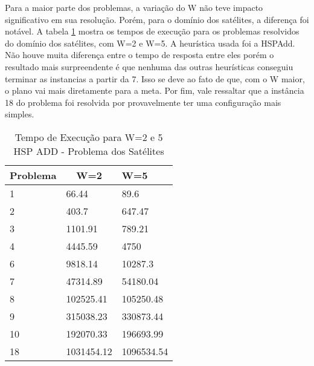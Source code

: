 Para a maior parte dos problemas, a variação do W não teve impacto significativo em sua resolução. Porém, para o domínio dos satélites, a diferença foi notável. A tabela \ref{analisew} mostra os tempos de execução para os problemas resolvidos do domínio dos satélites, com W=2 e W=5. A heurística usada foi a HSPAdd. Não houve muita diferença entre o tempo de resposta entre eles porém o resultado mais surpreendente é que nenhuma das outras heurísticas conseguiu terminar as instancias a partir da 7. Isso se deve ao fato de que, com o W maior, o plano vai mais diretamente para a meta. Por fim, vale ressaltar que a instância 18 do problema foi resolvida por provavelmente ter uma configuração mais simples.

\begin{table}[H]
\begin{tabular}{|l|l|l|}
\hline
Problema & \multicolumn{1}{c|}{W=2} & W=5        \\ \hline
1        & 66.44                    & 89.6       \\ \hline
2        & 403.7                    & 647.47     \\ \hline
3        & 1101.91                  & 789.21     \\ \hline
4        & 4445.59                  & 4750       \\ \hline
6        & 9818.14                  & 10287.3    \\ \hline
7        & 47314.89                 & 54180.04   \\ \hline
8        & 102525.41                & 105250.48  \\ \hline
9        & 315038.23                & 330873.44  \\ \hline
10       & 192070.33                & 196693.99  \\ \hline
18       & 1031454.12               & 1096534.54 \\ \hline
\end{tabular}
\caption{Tempo de Execução para W=2 e 5 HSP ADD - Problema dos Satélites}
\label{analisew}
\end{table}

